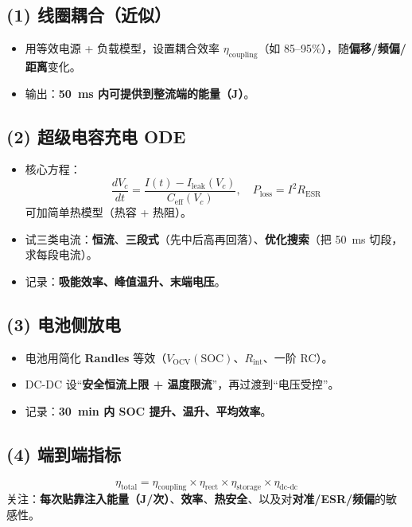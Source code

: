 \documentclass[11pt]{ctexart}
\begin{document}
\subsection*{(1) 线圈耦合（近似）}
\begin{itemize}
  \item 用等效电源 + 负载模型，设置耦合效率 $\eta_{\text{coupling}}$（如 85--95\%），随\textbf{偏移/频偏/距离}变化。
  \item 输出：\textbf{50~ms 内可提供到整流端的能量（J）}。
\end{itemize}

\subsection*{(2) 超级电容充电 ODE}
\begin{itemize}
  \item 核心方程：
    \[
      \frac{dV_c}{dt}=\frac{I(t)-I_{\text{leak}}(V_c)}{C_{\text{eff}}(V_c)},\quad
      P_{\text{loss}}=I^2 R_{\text{ESR}}
    \]
    可加简单热模型（热容 + 热阻）。
  \item 试三类电流：\textbf{恒流}、\textbf{三段式}（先中后高再回落）、\textbf{优化搜索}（把 50~ms 切段，求每段电流）。
  \item 记录：\textbf{吸能效率、峰值温升、末端电压}。
\end{itemize}

\subsection*{(3) 电池侧放电}
\begin{itemize}
  \item 电池用简化 \textbf{Randles} 等效（$V_{\text{OCV}}(\mathrm{SOC})$、$R_{\text{int}}$、一阶 RC）。
  \item DC-DC 设“\textbf{安全恒流上限 + 温度限流}”，再过渡到“电压受控”。
  \item 记录：\textbf{30~min 内 SOC 提升、温升、平均效率}。
\end{itemize}

\subsection*{(4) 端到端指标}
\[
  \eta_{\text{total}}=
  \eta_{\text{coupling}}\times
  \eta_{\text{rect}}\times
  \eta_{\text{storage}}\times
  \eta_{\text{dc-dc}}
\]
关注：\textbf{每次贴靠注入能量（J/次）}、\textbf{效率}、\textbf{热安全}、以及对\textbf{对准/ESR/频偏}的敏感性。
\end{document}
